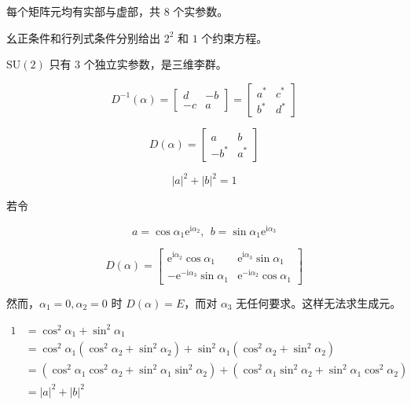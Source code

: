 每个矩阵元均有实部与虚部，共 $8$ 个实参数。

幺正条件和行列式条件分别给出 $2^2$ 和 $1$ 个约束方程。

$\mathrm{SU}\left(2\right)$ 只有 $3$ 个独立实参数，是三维李群。

\begin{equation}
D^{-1}\left(\alpha\right)
=\begin{bmatrix}
d &-b \\
-c &a
\end{bmatrix} 
=\begin{bmatrix}
a^* &c^* \\
b^* &d^*
\end{bmatrix}
\end{equation}

\begin{equation}
D\left(\alpha\right)
=\begin{bmatrix}
a &b \\
-b^* &a^*
\end{bmatrix}
\end{equation}


\begin{equation}
|a|^2 + |b|^2 = 1
\end{equation}

若令

\begin{equation}
a = \cos\alpha_1 \mathrm{e}^{\mathrm{i}\alpha_2},~~
b = \sin\alpha_1 \mathrm{e}^{\mathrm{i}\alpha_3}
\end{equation}

\begin{equation}
D\left(\alpha\right)
=\begin{bmatrix}
\mathrm{e}^{\mathrm{i}\alpha_2}\cos\alpha_1 &\mathrm{e}^{\mathrm{i}\alpha_3}\sin\alpha_1 \\
-\mathrm{e}^{-\mathrm{i}\alpha_3}\sin\alpha_1 &\mathrm{e}^{-\mathrm{i}\alpha_2}\cos\alpha_1
\end{bmatrix}
\end{equation}

然而，$\alpha_1=0,\alpha_2 = 0$ 时 $D\left(\alpha\right) = E$，而对 $\alpha_3$ 无任何要求。这样无法求生成元。

\begin{align}
1
&=\cos^2\alpha_1 + \sin^2\alpha_1 \\
&=\cos^2\alpha_1\left(\cos^2\alpha_2 + \sin^2\alpha_2 \right) + \sin^2\alpha_1 \left(\cos^2\alpha_2 + \sin^2\alpha_2 \right)\\
&=\left(\cos^2\alpha_1 \cos^2\alpha_2 + \sin^2\alpha_1 \sin^2\alpha_2 \right) + \left(\cos^2\alpha_1 \sin^2\alpha_2 + \sin^2\alpha_1 \cos^2\alpha_2 \right) \\
&=|a|^2 + |b|^2
\end{align}

